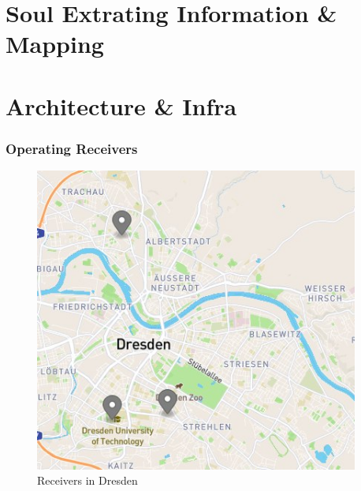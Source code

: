 \documentclass[aspectratio=169]{beamer}
\begin{document}

\section{Soul Extrating Information \& Mapping }




\section{Architecture \& Infra }


\begin{frame}
\frametitle{Operating Receivers}
\begin{figure}
\begin{columns}
\begin{center}
\includegraphics[height=0.7\textheight]{figs/map_dresden.jpg}
\end{center}
\caption{Receivers in Dresden}
\raggedright
\begin{center}

\end{center}
\end{columns}
\end{figure}
\end{frame}
\end{document}
